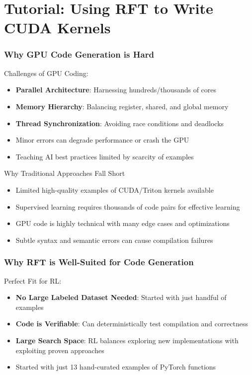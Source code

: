 \documentclass[aspectratio=169]{beamer}
\begin{document}
\section{Tutorial: Using RFT to Write CUDA Kernels}

\begin{frame}
	\frametitle{Why GPU Code Generation is Hard}
	\begin{block}{Challenges of GPU Coding:}
		\begin{itemize}
			\item \textbf{Parallel Architecture}: Harnessing hundreds/thousands of cores
			\item \textbf{Memory Hierarchy}: Balancing register, shared, and global memory
			\item \textbf{Thread Synchronization}: Avoiding race conditions and deadlocks
			\item Minor errors can degrade performance or crash the GPU
			\item Teaching AI best practices limited by scarcity of examples
		\end{itemize}
	\end{block}
	\begin{block}{Why Traditional Approaches Fall Short}
		\begin{itemize}
			\item Limited high-quality examples of CUDA/Triton kernels available
			\item Supervised learning requires thousands of code pairs for effective learning
			\item GPU code is highly technical with many edge cases and optimizations
			\item Subtle syntax and semantic errors can cause compilation failures
		\end{itemize}
	\end{block}
\end{frame}

\begin{frame}
	\frametitle{Why RFT is Well-Suited for Code Generation}
	\begin{block}{Perfect Fit for RL:}
		\begin{itemize}
			\item \textbf{No Large Labeled Dataset Needed}: Started with just handful of examples
			\item \textbf{Code is Verifiable}: Can deterministically test compilation and correctness
			\item \textbf{Large Search Space}: RL balances exploring new implementations with exploiting proven approaches
			\item Started with just 13 hand-curated examples of PyTorch functions
		\end{itemize}
	\end{block}
\end{frame}
\end{document}
